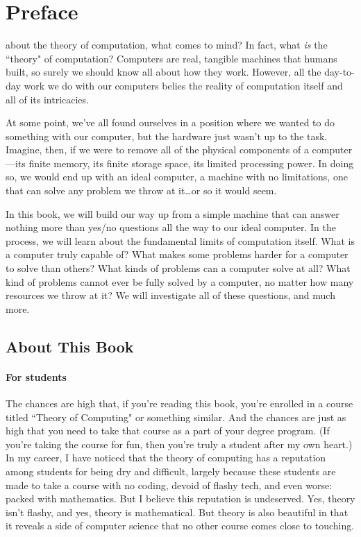 \chapter{Preface}\label{chap:preface}

 about the theory of computation, what comes to mind? In fact, what \emph{is} the ``theory" of computation? Computers are real, tangible machines that humans built, so surely we should know all about how they work. However, all the day-to-day work we do with our computers belies the reality of computation itself and all of its intricacies.

At some point, we've all found ourselves in a position where we wanted to do something with our computer, but the hardware just wasn't up to the task. Imagine, then, if we were to remove all of the physical components of a computer---its finite memory, its finite storage space, its limited processing power. In doing so, we would end up with an ideal computer, a machine with no limitations, one that can solve any problem we throw at it\dots or so it would seem.

In this book, we will build our way up from a simple machine that can answer nothing more than yes/no questions all the way to our ideal computer. In the process, we will learn about the fundamental limits of computation itself. What is a computer truly capable of? What makes some problems harder for a computer to solve than others? What kinds of problems can a computer solve at all? What kind of problems cannot ever be fully solved by a computer, no matter how many resources we throw at it? We will investigate all of these questions, and much more.

\section*{About This Book}

\subsubsection*{For students}

The chances are high that, if you're reading this book, you're enrolled in a course titled ``Theory of Computing" or something similar. And the chances are just as high that you need to take that course as a part of your degree program. (If you're taking the course for fun, then you're truly a student after my own heart.) In my career, I have noticed that the theory of computing has a reputation among students for being dry and difficult, largely because these students are made to take a course with no coding, devoid of flashy tech, and even worse: packed with mathematics. But I believe this reputation is undeserved. Yes, theory isn't flashy, and yes, theory is mathematical. But theory is also beautiful in that it reveals a side of computer science that no other course comes close to touching.

